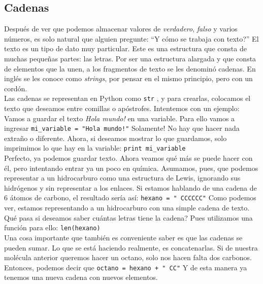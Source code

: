 \documentclass[10pt,letterpaper]{article}
\newcommand{\inlinecode}[1]{
\colorbox{light-gray}{\texttt{#1}}
}
\begin{document}
\subsection{Cadenas}
Despu\'es de ver que podemos almacenar valores de \emph{verdadero}, \emph{falso} y varios n\'umeros, es solo natural que alguien pregunte: ``Y c\'omo se trabaja con texto?'' El texto es un tipo de dato muy particular. Este es una estructura que consta de muchas peque\~nas partes: las letras. Por ser una estructura alargada y que consta de elementos que la unen, a los fragmentos de texto se les denomin\'o cadenas. En ingl\'es se les conoce como \emph{strings}, por pensar en el mismo principio, pero con un cord\'on.\\

Las cadenas se representan en Python como \inlinecode{str}, y para crearlas, colocamos el texto que deseamos entre comillas o ap\'ostrofes. Intentemos con un ejemplo: Vamos a guardar el texto \textit{Hola mundo!} en una variable. Para ello vamos a ingresar \inlinecode{mi\_variable = "Hola mundo!"} Solamente! No hay que hacer nada extra\~no o diferente. Ahora, si deseamos mostrar lo que guardamos, solo imprimimos lo que hay en la variable: \inlinecode{print mi\_variable}\\

Perfecto, ya podemos guardar texto. Ahora veamos qu\'e m\'as se puede hacer con \'el, pero intentando entrar ya un poco en qu\'imica. Asumamos, pues, que podemos representar a un hidrocarburo como una estructura de Lewis, ignorando sus hidr\'ogenos y sin representar a los enlaces. Si estamos hablando de una cadena de 6 \'atomos de carbono, el resultado ser\'ia as\'i: \inlinecode{hexano = "\ \hspace{-2mm}CCCCCC"} Como podemos ver, estamos representando a un hidrocarburo con una simple cadena de texto. Qu\'e pasa si deseamos saber cu\'antas letras tiene la cadena? Pues utilizamos una funci\'on para ello: \inlinecode{len(hexano)}\\

Una cosa importante que tambi\'en es conveniente saber es que las cadenas se pueden sumar. Lo que se est\'a haciendo realmente, es concatenarlas. Si de nuestra mol\'ecula anterior queremos hacer un octano, solo nos hacen falta dos carbonos. Entonces, podemos decir que \inlinecode{octano = hexano + "\ \hspace{-2mm}CC"} Y de esta manera ya tenemos una nueva cadena con nuevos elementos.\\
\end{document}
